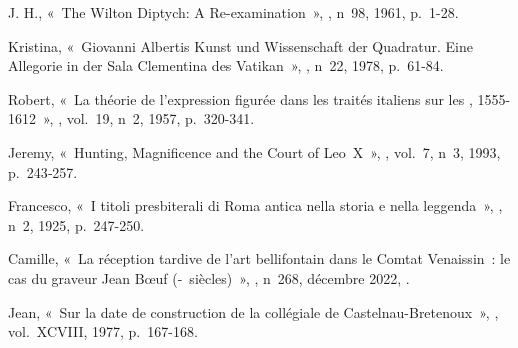 \begin{teiElement}[name={TEI},change={commons\_edition}]
\begin{teiElement}[name={text},type={book},xmlid={book}]
\begin{teiElement}[name={group},type={book},xmlid={book-001}]
\begin{teiElement}[name={group},type={bibliography},data-page-title={Sources et bibliographie},data-include-href={Ch14\_Source\_bibliographie.xml},xmlid={bibliography-001}]
\begin{teiElement}[name={body}]
\begin{teiDiv}[type={section1},xmlid={div18}]
\begin{teiDiv}[type={section2},xmlid={div20}]
              \begin{teiBibl}[xmlid={bibl-456}]
 J. H., « The Wilton Diptych: A Re-examination », , n 98, 1961, p. 1-28.
\end{teiBibl}
              \begin{teiBibl}[xmlid={bibl-457}]
 Kristina, « Giovanni Albertis Kunst und Wissenschaft der Quadratur. Eine Allegorie in der Sala Clementina des Vatikan », , n 22, 1978, p. 61-84.
\end{teiBibl}
              \begin{teiBibl}[xmlid={bibl-458}]
 Robert, « La théorie de l’expression figurée dans les traités italiens sur les , 1555-1612 », , vol. 19, n 2, 1957, p. 320-341.
\end{teiBibl}
              \begin{teiBibl}[xmlid={bibl-459}]
 Jeremy, « Hunting, Magnificence and the Court of Leo X », , vol. 7, n 3, 1993, p. 243‑257.
\end{teiBibl}
              \begin{teiBibl}[xmlid={bibl-460}]
 Francesco, « I titoli presbiterali di Roma antica nella storia e nella leggenda », , n 2, 1925, p. 247-250.
\end{teiBibl}
              \begin{teiBibl}[xmlid={bibl-461}]
 Camille, « La réception tardive de l’art bellifontain dans le Comtat Venaissin : le cas du graveur Jean Bœuf (- siècles) », , n 268, décembre 2022, .
\end{teiBibl}
              \begin{teiBibl}[xmlid={bibl-462}]
 Jean, « Sur la date de construction de la collégiale de Castelnau-Bretenoux », , vol. XCVIII, 1977, p. 167-168.

\end{teiBibl}
\end{teiDiv}
\end{teiDiv}
\end{teiElement}
\end{teiElement}
\end{teiElement}
\end{teiElement}
\end{teiElement}
